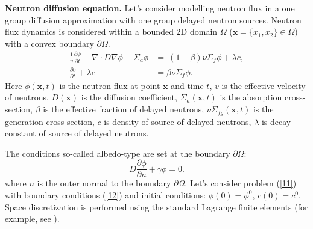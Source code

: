 \documentclass[runningheads]{llncs}
\begin{document}
\textbf{Neutron diffusion equation.}
Let's consider modelling neutron flux in a one group diffusion approximation with one group delayed neutron sources. Neutron flux dynamics is considered within a bounded 2D domain  $\Omega$ ($\bm x = \{x_1, x_2\} \in \Omega$) with a convex boundary $\partial \Omega$.
 \begin{equation}\label{11}
\begin{split}
 \frac{1}{v} \frac{\partial \phi}{\partial t} -  \nabla \cdot D \nabla \phi + \Sigma_{a} \phi &=   \ (1-\beta) \nu \Sigma_{f} \phi + \lambda c, \\
\frac{\partial c}{\partial t} + \lambda c &= \beta \nu \Sigma_{f} \phi.
\end{split}
\end{equation} 
Here $\phi(\bm x,t)$ is the neutron flux at point $\bm x$ and time $t$,
$v$ is the effective velocity of neutrons,
$D(\bm x)$ is the diffusion coefficient, 
$\Sigma_{a}(\bm x,t)$ is the absorption cross-section,
$\beta$ is the effective fraction of delayed neutrons, 
$\nu\Sigma_{fg}(\bm x,t)$ is the generation cross-section,
$c$ is density of source of delayed neutrons, 
$\lambda$  is decay constant of source of delayed neutrons.

The conditions so-called albedo-type are set at the boundary $\partial \Omega$:
\begin{equation}\label{12}
 D\frac{\partial \phi}{\partial n} + \gamma \phi = 0.
\end{equation}\label{13}
where $n$ is the outer normal to the boundary $\partial \Omega$.
Let's consider problem (\ref{11}) with boundary conditions (\ref{12}) and initial conditions:
$
 \phi(0) = \phi^0,  \,
 c(0) = c^0.
$
Space discretization is performed using the standard Lagrange finite elements (for example, see \cite{Matmod}).
\end{document}
